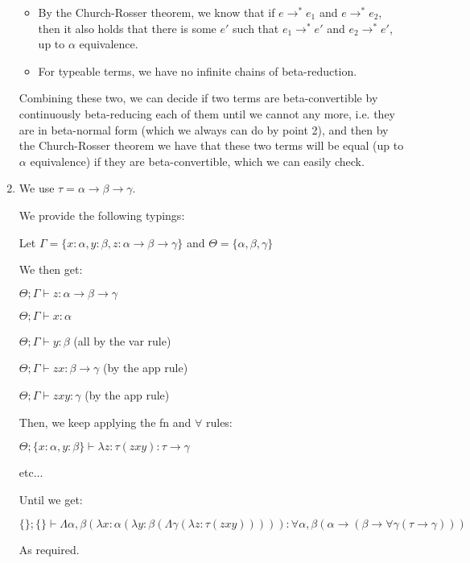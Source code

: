 \begin{enumerate}[label=(\alph*)]
  \begin{itemize}
    \item
      By the Church-Rosser theorem, we know that if $e \rightarrow^* e_1$ and $e \rightarrow^* e_2$, then it also holds that there is some $e'$ such that $e_1 \rightarrow^* e'$ and $e_2 \rightarrow^* e'$, up to $\alpha$ equivalence.
    \item
      For typeable terms, we have no infinite chains of beta-reduction.
  \end{itemize}

  Combining these two, we can decide if two terms are beta-convertible by continuously beta-reducing each of them until we cannot any more, i.e. they are in beta-normal form (which we always can do by point 2), and then by the Church-Rosser theorem we have that these two terms will be equal (up to $\alpha$ equivalence) if they are beta-convertible, which we can easily check.

\item

  We use $\tau = \alpha \rightarrow \beta \rightarrow \gamma$.

  We provide the following typings:

  Let $\Gamma = \{x : \alpha, y : \beta, z : \alpha \rightarrow \beta \rightarrow \gamma\}$ and $\Theta = \{\alpha, \beta, \gamma\}$

  We then get:

  $\Theta;\Gamma \vdash z : \alpha \rightarrow \beta \rightarrow \gamma$

  $\Theta;\Gamma \vdash x : \alpha$

  $\Theta;\Gamma \vdash y : \beta$ (all by the var rule)

  $\Theta;\Gamma \vdash z x : \beta \rightarrow \gamma$ (by the app rule)

  $\Theta;\Gamma \vdash z x y : \gamma$ (by the app rule)

  Then, we keep applying the fn and $\forall$ rules:

  $\Theta;\{x:\alpha, y:\beta\} \vdash \lambda z: \tau (z x y) : \tau \rightarrow \gamma$

  etc...

  Until we get:

  $\{\};\{\} \vdash \Lambda \alpha,\beta(\lambda x:\alpha(\lambda y:\beta(\Lambda \gamma(\lambda z: \tau (z x y))))) : \forall \alpha, \beta (\alpha \rightarrow (\beta \rightarrow \forall \gamma (\tau \rightarrow\gamma)))$

  As required.


\end{enumerate}
